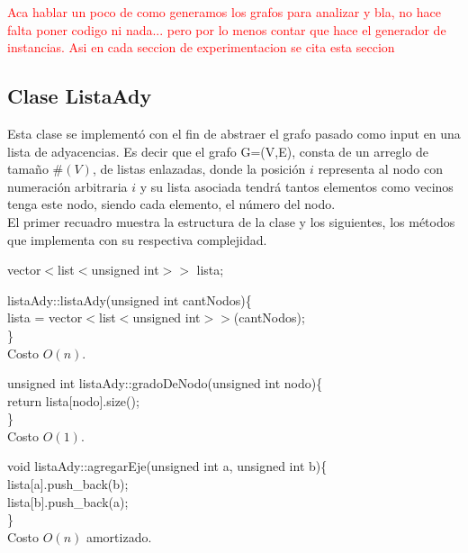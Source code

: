 \documentclass[a4paper]{article}
\begin{document}
\textcolor{red}{Aca hablar un poco de como generamos los grafos para analizar y bla, no hace falta poner codigo ni nada... pero por lo menos contar que hace el generador de instancias. Asi en cada seccion de experimentacion se cita esta seccion}

\subsection{Clase ListaAdy} \label{listaAdy}

Esta clase se implement\'o con el fin de abstraer el grafo pasado como input en una lista de adyacencias. Es decir que el grafo G=(V,E), consta de un arreglo de tama\~no $\#(V)$, de listas enlazadas, donde la posici\'on $i$ representa al nodo con numeraci\'on arbitraria $i$ y su lista asociada tendr\'a tantos elementos como vecinos tenga este nodo, siendo cada elemento, el n\'umero del nodo.\\

El primer recuadro muestra la estructura de la clase y los siguientes, los m\'etodos que implementa con su respectiva complejidad.

\begin{algorithm}[h!]
	vector$<$list$<$unsigned int$> >$ lista;
\end{algorithm}

\begin{algorithm}[h!]
listaAdy::listaAdy(unsigned int cantNodos)\{\\
	lista = vector$<$list$<$unsigned int$> >$(cantNodos);\\
\}\\
Costo $O(n)$.
\end{algorithm}


\begin{algorithm}[h!]
unsigned int listaAdy::gradoDeNodo(unsigned int nodo)\{\\
	return lista[nodo].size();\\
\}\\
Costo $O(1)$.
\end{algorithm}


\begin{algorithm}[h!]
void listaAdy::agregarEje(unsigned int a, unsigned int b)\{\\
	lista[a].push_back(b);\\
	lista[b].push_back(a);\\
\}\\
Costo $O(n)$ amortizado.
\end{algorithm}
\end{document}
